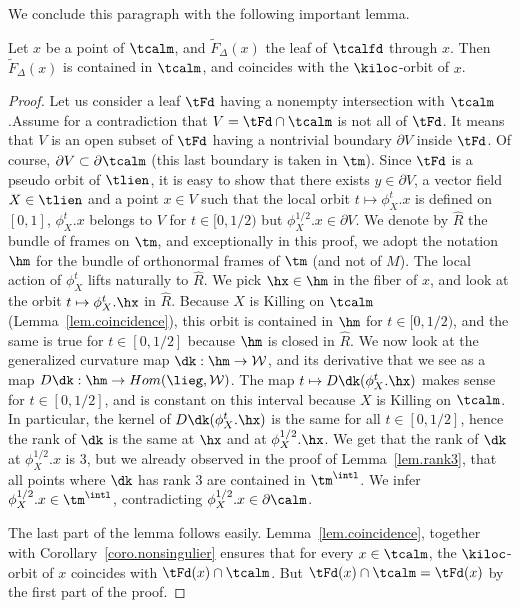 We conclude this paragraph with the following important lemma.


\begin{lemm}\label{lem.saturation1}
Let $x$ be a point of $\tcalm$, and $\tilde{F}_{\Delta}(x)$ the leaf of $\tcalfd$ through $x$. Then $\tilde{F}_{\Delta}(x)$ is contained in $ \tcalm$, and coincides with the $\kiloc$-orbit of $x$.
\end{lemm}

\begin{proof}
Let us consider a leaf $\tFd$ having a nonempty intersection with $\tcalm$.\linebreak Assume for a contradiction that $V=\tFd \cap \tcalm$ is not all of $\tFd$. It means that $V$ is an open subset of $\tFd$ having a nontrivial boundary $\partial{V}$ inside $\tFd$. Of course, $\partial V \subset \partial \tcalm$ (this last boundary is taken in $\tm$). Since $\tFd$ is a pseudo orbit of $\tlien$, it is easy to show that there exists $y \in \partial{V}$, a vector field $X \in \tlien$ and a point $x \in {V}$ such that the local orbit $t \mapsto \phi_{X}^t.x$ is defined on $[0,1]$, $\phi_{X}^t.x$ belongs to ${V}$ for $t \in [0,1/2)$ but $\phi_{X}^{1/2}.x \in \partial {V}$. We denote by $\hat{R}$ the bundle of frames on $\tm$, and exceptionally in this proof, we adopt the notation $\hm$ for the bundle of orthonormal frames of $\tm$ (and not of $M$). The local action of $\phi_{X}^t$ lifts naturally to $\hat{R}$. We pick $\hx \in \hm$ in the fiber of $x$, and look at the orbit $t \mapsto \phi_{X}^t.\hx$ in $\hat{R}$. Because $X$ is Killing on $\tcalm$ (Lemma~\ref{lem.coincidence}), this orbit is contained in $\hm$ for $t \in [0,1/2)$, and the same is true for $t \in [0,1/2]$ because $\hm$ is closed in $\hat{R}$. We now look at the generalized curvature map $\dk : \hm \to \mathcal{W}$, and its derivative that we see as a map $D \dk : \hm \to Hom(\lieg, \mathcal{W})$. The map $t \mapsto D \dk(\phi_{X}^t.\hx)$ makes sense for $t \in [0,1/2]$, and is constant on this interval because $X$ is Killing on $\tcalm$. In particular, the kernel of $D \dk(\phi_{X}^t.\hx)$ is the same for all $t \in [0,1/2]$, hence the rank of $\dk$ is the same at $\hx$ and at $\phi_{X}^{1/2}.\hx$. We get that the rank of $\dk$ at $\phi_{X}^{1/2}.x$ is $3$, but we already observed in the proof of Lemma~\ref{lem.rank3}, that all points where $\dk$ has rank $3$ are contained in $\tm^{\intl}$. We infer $\phi_{X}^{1/2}.x \in \tm^{\intl}$, contradicting $\phi_{X}^{1/2}.x \in \partial \calm$.

The last part of the lemma follows easily. Lemma~\ref{lem.coincidence}, together with Corollary~\ref{coro.nonsingulier} ensures that for every $x \in \tcalm$, the $\kiloc$-orbit of $x$ coincides with $\tFd(x) \cap \tcalm$. But $\tFd(x) \cap \tcalm=\tFd(x)$ by the first part of the proof.
\end{proof}




